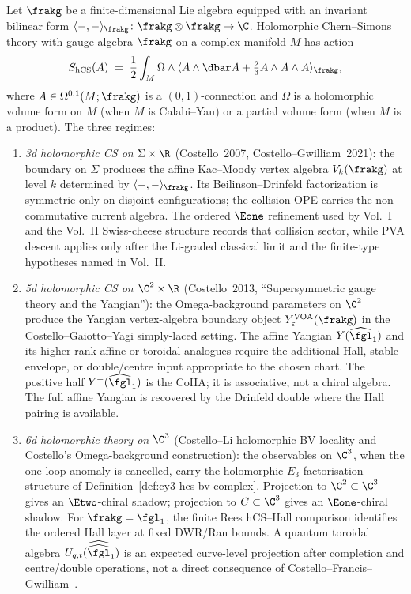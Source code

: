 \begin{construction}
\label{constr:hol-cs-hierarchy}
Let $\frakg$ be a finite-dimensional Lie algebra equipped with an invariant bilinear form $\langle -, - \rangle_{\frakg} \colon \frakg \otimes \frakg \to \C$. Holomorphic Chern--Simons theory with gauge algebra $\frakg$ on a complex manifold $M$ has action
\[
 S_{\mathrm{hCS}}(A) \;=\; \frac{1}{2} \int_M \Omega \wedge \langle A \wedge \dbar A + \tfrac{2}{3} A \wedge A \wedge A \rangle_{\frakg},
\]
where $A \in \Omega^{0,1}(M; \frakg)$ is a $(0,1)$-connection and $\Omega$ is a holomorphic volume form on $M$ (when $M$ is Calabi--Yau) or a partial volume form (when $M$ is a product). The three regimes:
\begin{enumerate}[label=\textup{(\roman*)}]
 \item \emph{3d holomorphic CS on $\Sigma \times \R$} (Costello~2007, Costello--Gwilliam~2021):
 the boundary on $\Sigma$ produces the affine Kac--Moody vertex algebra $V_k(\frakg)$ at level $k$ determined by $\langle -, - \rangle_{\frakg}$. Its Beilinson--Drinfeld factorization is symmetric only on disjoint configurations; the collision OPE carries the non-commutative current algebra. The ordered $\Eone$ refinement used by Vol.~I and the Vol.~II Swiss-cheese structure records that collision sector, while PVA descent applies only after the Li-graded classical limit and the finite-type hypotheses named in Vol.~II.

 \item \emph{5d holomorphic CS on $\C^2 \times \R$} (Costello~2013, ``Supersymmetric gauge theory and the Yangian''):
 the Omega-background parameters on $\C^2$ produce the Yangian
 vertex-algebra boundary object \(Y^{\mathrm{VOA}}_\varepsilon(\frakg)\)
 in the Costello--Gaiotto--Yagi simply-laced setting.  The affine
 Yangian \(Y(\widehat{\fgl}_1)\) and its higher-rank affine or toroidal
 analogues require the additional Hall, stable-envelope, or
 double/centre input appropriate to the chosen chart.  The positive
 half $Y^+(\widehat{\fgl}_1)$ is the CoHA; it is associative, not a
 chiral algebra.  The full affine Yangian is recovered by the Drinfeld
 double where the Hall pairing is available.

 \item \emph{6d holomorphic theory on $\C^3$} (Costello--Li holomorphic BV locality and Costello's Omega-background construction):
 the observables on $\C^3$, when the one-loop anomaly is cancelled, carry the holomorphic $E_3$ factorisation structure of Definition~\ref{def:cy3-hcs-bv-complex}. Projection to $\C^2 \subset \C^3$ gives an $\Etwo$-chiral shadow; projection to $C \subset \C^3$ gives an $\Eone$-chiral shadow. For $\frakg = \fgl_1$, the finite Rees hCS--Hall comparison identifies the ordered Hall layer at fixed DWR/Ran bounds.  A quantum toroidal algebra \(U_{q,t}(\widehat{\widehat{\fgl}}_1)\) is an expected curve-level projection after completion and centre/double operations, not a direct consequence of Costello--Francis--Gwilliam~\cite{CFG2026}.
\end{enumerate}
\end{construction}

